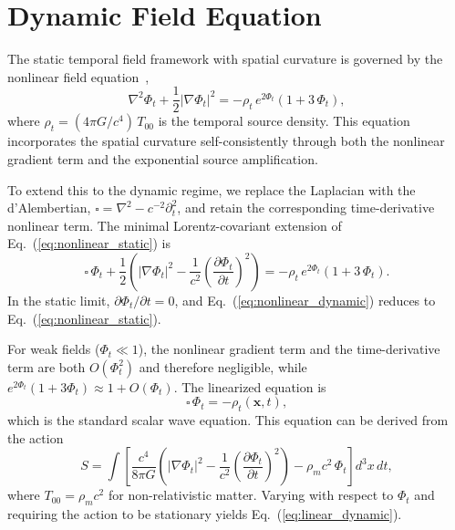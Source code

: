 \documentclass[12pt]{article}
\begin{document}
\section{Dynamic Field Equation}
\label{sec:dynamic_field}

The static temporal field framework with spatial curvature is governed by the nonlinear field equation~\cite{Gwak2026b},
\begin{equation}
\nabla^2\Phi_t + \frac{1}{2}|\nabla\Phi_t|^2 = -\rho_t\,e^{2\Phi_t}(1 + 3\,\Phi_t),
\label{eq:nonlinear_static}
\end{equation}
where $\rho_t = (4\pi G/c^4)\,T_{00}$ is the temporal source density. This equation incorporates the spatial curvature self-consistently through both the nonlinear gradient term and the exponential source amplification.

To extend this to the dynamic regime, we replace the Laplacian with the d'Alembertian, $\square = \nabla^2 - c^{-2}\partial_t^2$, and retain the corresponding time-derivative nonlinear term. The minimal Lorentz-covariant extension of Eq.~(\ref{eq:nonlinear_static}) is
\begin{equation}
\square\,\Phi_t + \frac{1}{2}\left(|\nabla\Phi_t|^2 - \frac{1}{c^2}\left(\frac{\partial\Phi_t}{\partial t}\right)^2\right) = -\rho_t\,e^{2\Phi_t}(1 + 3\,\Phi_t).
\label{eq:nonlinear_dynamic}
\end{equation}
In the static limit, $\partial\Phi_t/\partial t = 0$, and Eq.~(\ref{eq:nonlinear_dynamic}) reduces to Eq.~(\ref{eq:nonlinear_static}). 

For weak fields ($\Phi_t \ll 1$), the nonlinear gradient term and the time-derivative term are both $O(\Phi_t^2)$ and therefore negligible, while $e^{2\Phi_t}(1+3\Phi_t) \approx 1 + O(\Phi_t)$. The linearized equation is
\begin{equation}
\square\,\Phi_t = -\rho_t(\mathbf{x}, t),
\label{eq:linear_dynamic}
\end{equation}
which is the standard scalar wave equation. This equation can be derived from the action
\begin{equation}
S = \int\left[\frac{c^4}{8\pi G}\left(|\nabla\Phi_t|^2 - \frac{1}{c^2}\left(\frac{\partial\Phi_t}{\partial t}\right)^2\right) - \rho_m c^2\,\Phi_t\right]d^3x\,dt,
\label{eq:action}
\end{equation}
where $T_{00} = \rho_m c^2$ for non-relativistic matter. Varying with respect to $\Phi_t$ and requiring the action to be stationary yields Eq.~(\ref{eq:linear_dynamic}).
\end{document}
